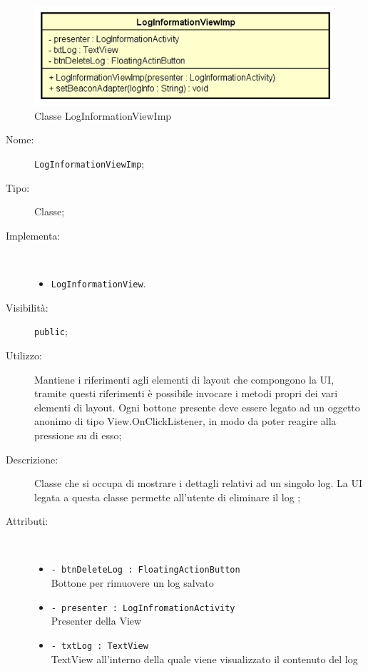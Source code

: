 \documentclass[../DefinizioneDiProdotto.tex]{subfiles}
\begin{document}
    \begin{figure}[H]
        \centering
        \includegraphics{img/LogInformationViewImp.png}
        \caption{Classe LogInformationViewImp}\label{fig:view::LogInformationViewImp} 
    \end{figure}
    \begin{description}
\item[Nome:] \texttt{LogInformationViewImp};
\item[Tipo:] Classe;
\item[Implementa:] \
\begin{itemize}
\item \texttt{LogInformationView}.

\end{itemize}
\item[Visibilità:] \texttt{public};
\item[Utilizzo:] Mantiene i riferimenti agli elementi di layout che compongono la UI, tramite questi riferimenti è possibile invocare i metodi propri dei vari elementi di layout. Ogni bottone presente deve essere legato ad un oggetto anonimo di tipo View.OnClickListener, in modo da poter reagire alla pressione su di esso;
\item[Descrizione:] Classe che si occupa di mostrare i dettagli relativi ad un singolo log. La UI legata a questa classe permette all'utente di eliminare il log ;
\item[Attributi:] \
\begin{itemize}
\item \texttt{- btnDeleteLog : FloatingActionButton}\\
Bottone per rimuovere un log salvato

\item \texttt{- presenter : LogInfromationActivity}\\
Presenter della View

\item \texttt{- txtLog : TextView}\\
TextView all'interno della quale viene visualizzato il contenuto del log


\end{itemize}
\end{description}
\end{document}
